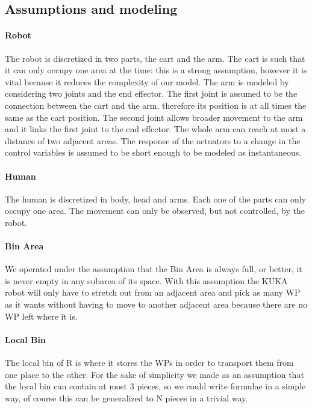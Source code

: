 \documentclass[a4paper]{article}
\begin{document}
\pagebreak
\subsection{Assumptions and modeling}
\paragraph{Robot}
The robot is discretized in two parts, the cart and the arm. The cart is such that it can only occupy one area at the time: this is a strong assumption, however it is vital because it reduces the complexity of our model. The arm is modeled by considering two joints and the end effector. The first joint is assumed to be the connection between the cart and the arm, therefore its position is at all times the same as the cart position. The second joint allows broader movement to the arm and it links the first joint to the end effector. The whole arm can reach at most a distance of two adjacent areas. The response of the actuators to a change in the control variables is assumed to be short enough to be modeled as instantaneous.

\paragraph{Human}
The human is discretized in body, head and arms. Each one of the parts can only occupy one area. The movement can only be observed, but not controlled, by the robot.

\paragraph{Bin Area}
We operated under the assumption that the Bin Area is always full, or better, it is never empty in any subarea of its space. With this assumption the KUKA robot will only have to stretch out from an adjacent area and pick as many WP as it wants without having to move to another adjacent area because there are no WP left where it is. 

\paragraph{Local Bin}
The local bin of R is where it stores the WPs in order to transport them from one place to the other. For the sake of simplicity we made as an assumption that the local bin can contain at most 3 pieces, so we could write formulae in a simple way, of course this can be generalized to N pieces in a trivial way.
\end{document}

